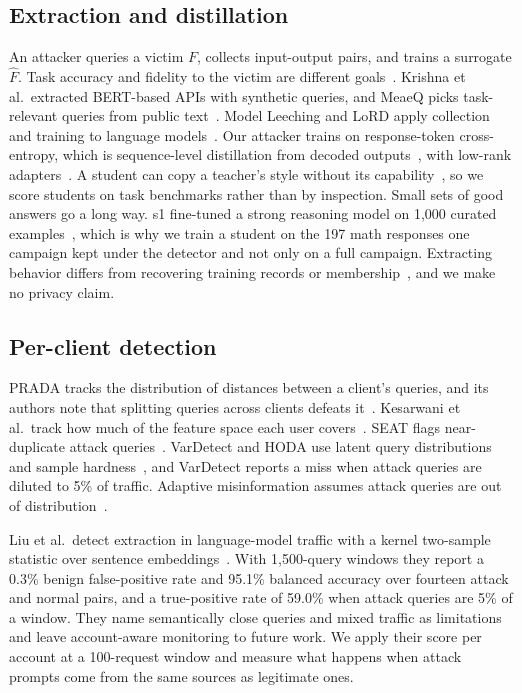 \documentclass[journal]{IEEEtran}
\begin{document}
\subsection{Extraction and distillation}
An attacker queries a victim $F$, collects input-output pairs, and trains a surrogate $\widehat F$. Task accuracy and fidelity to the victim are different goals~\cite{jagielski2020high}. Krishna et al.\ extracted BERT-based APIs with synthetic queries, and MeaeQ picks task-relevant queries from public text~\cite{krishna2020thieves,dai2023meaeq}. Model Leeching and LoRD apply collection and training to language models~\cite{birch2023leeching,liang2025lord}. Our attacker trains on response-token cross-entropy, which is sequence-level distillation from decoded outputs~\cite{kim2016sequence}, with low-rank adapters~\cite{hu2022lora,dettmers2023qlora}. A student can copy a teacher's style without its capability~\cite{gudibande2024false}, so we score students on task benchmarks rather than by inspection. Small sets of good answers go a long way. s1 fine-tuned a strong reasoning model on 1,000 curated examples~\cite{muennighoff2025s1}, which is why we train a student on the 197 math responses one campaign kept under the detector and not only on a full campaign. Extracting behavior differs from recovering training records or membership~\cite{carlini2021extracting,shokri2017membership}, and we make no privacy claim.

\subsection{Per-client detection}
PRADA tracks the distribution of distances between a client's queries, and its authors note that splitting queries across clients defeats it~\cite{juuti2019prada}. Kesarwani et al.\ track how much of the feature space each user covers~\cite{kesarwani2018warning}. SEAT flags near-duplicate attack queries~\cite{zhang2021seat}. VarDetect and HODA use latent query distributions and sample hardness~\cite{pal2021stateful,sadeghzadeh2022hoda}, and VarDetect reports a miss when attack queries are diluted to 5\% of traffic. Adaptive misinformation assumes attack queries are out of distribution~\cite{kariyappa2020adaptive}.

Liu et al.\ detect extraction in language-model traffic with a kernel two-sample statistic over sentence embeddings~\cite{liu2026detector,mmd2026artifact}. With 1,500-query windows they report a 0.3\% benign false-positive rate and 95.1\% balanced accuracy over fourteen attack and normal pairs, and a true-positive rate of 59.0\% when attack queries are 5\% of a window. They name semantically close queries and mixed traffic as limitations and leave account-aware monitoring to future work. We apply their score per account at a 100-request window and measure what happens when attack prompts come from the same sources as legitimate ones.
\end{document}
